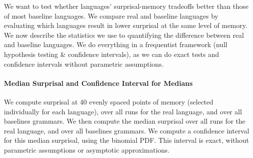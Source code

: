 We want to test whether languages' surprisal-memory tradeoffs better than those of most baseline languages.
We compare real and baseline languages by evaluating which languages result in lower surprisal at the same level of memory.
We now describe the statistics we use to quantifying the difference between real and baseline languages.
We do everything in a frequentist framework (null hypothesis testing \& confidence intervals), as we can do exact tests and confidence intervals without parametric assumptions.

\paragraph{Median Surprisal and Confidence Interval for Medians}
We compute surprisal at 40 evenly spaced points of memory (selected individually for each language), over all runs for the real language, and over all baselines grammars.
We then compute the median surprisal over all runs for the real language, and over all baselines grammars.
We compute a confidence interval for this median surprisal, using the binomial PDF. 
This interval is exact, without parametric assumptions or asymptotic approximations.



%


